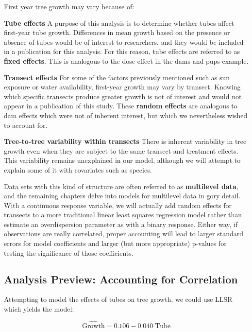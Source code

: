 \documentclass[
]{krantz}
\begin{document}
First year tree growth may vary because of:

\textbf{Tube effects} A purpose of this analysis is to determine whether tubes affect first-year tube growth. Differences in mean growth based on the presence or absence of tubes would be of interest to researchers, and they would be included in a publication for this analysis. For this reason, tube effects are referred to as \textbf{fixed effects}. This is analogous to the dose effect in the dams and pups example.

\textbf{Transect effects} For some of the factors previously mentioned such as sun exposure or water availability, first-year growth may vary by transect. Knowing which specific transects produce greater growth is not of interest and would not appear in a publication of this study. These \textbf{random effects} are analogous to dam effects which were not of inherent interest, but which we nevertheless wished to account for.

\textbf{Tree-to-tree variability within transects} There is inherent variability in tree growth even when they are subject to the same transect and treatment effects. This variability remains unexplained in our model, although we will attempt to explain some of it with covariates such as species.

Data sets with this kind of structure are often referred to as \textbf{multilevel data},  and the remaining chapters delve into models for multilevel data in gory detail. With a continuous response variable, we will actually add random effects for transects to a more traditional linear least squares regression model rather than estimate an overdispersion parameter as with a binary response. Either way, if observations are really correlated, proper accounting will lead to larger standard errors for model coefficients and larger (but more appropriate) p-values for testing the significance of those coefficients.

\hypertarget{analysis-preview-accounting-for-correlation}{%
\subsection{Analysis Preview: Accounting for Correlation}\label{analysis-preview-accounting-for-correlation}}

Attempting to model the effects of tubes on tree growth, we could use LLSR which yields the model:

\begin{equation*}
  \hat{\textrm{Growth}} = 0.106 - 0.040\; \textrm{Tube}
\end{equation*}
\end{document}
